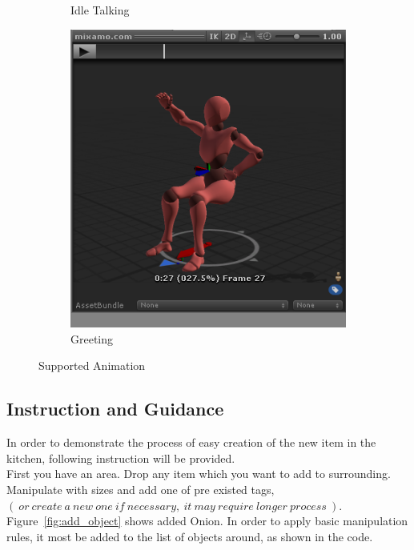 \documentclass[18pt]{article}
\numberwithin{equation}{section} %
\numberwithin{figure}{section} %
\numberwithin{table}{section} %
\begin{document}
\begin{figure}[H]
\begin{subfigure}{0.2\textwidth}
			\caption{Idle Talking}
		\end{subfigure}
		\begin{subfigure}{0.2\textwidth}
			\centering
			\includegraphics[width=0.96\linewidth]{images/sit_wave}
			\caption{Greeting}
		\end{subfigure}				
		\caption{Supported Animation}
		\label{fig:animat}
	\end{figure}
	
	\subsection{Instruction and Guidance}
	
	In order to demonstrate the process of easy creation of the new item in the kitchen, following instruction will be provided.\\
	
	First you have an area. Drop any item which you want to add to surrounding. Manipulate with sizes and add one of pre existed tags, $\left(\ or\ create\ a\ new\ one\ if\ necessary,\ it\ may\ require\ longer\ process\  \right) . $ Figure~\ref{fig:add_object} shows added Onion. In order to apply basic manipulation rules, it most be added to the list of objects around, as shown in the code. \\
	
\end{document}
